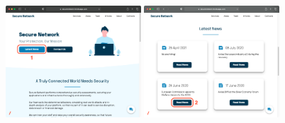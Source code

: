 \documentclass[12pt]{report}
\begin{document}
\begin{figure}[H]
	\centering
	\includegraphics[width=0.45\textwidth]{scenarios/4/1.png}
	\includegraphics[width=0.45\textwidth]{scenarios/4/2.png}
\end{figure}
\end{document}
